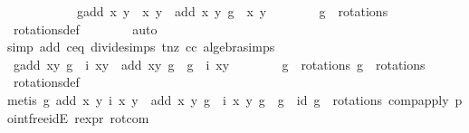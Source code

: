 \begin{isabellebody}
\ \ \isamarkupfalse%
\ {\isacharminus}\isanewline
\ \ \ \ \isamarkupfalse%
\ {}{\isacharcolon}\ {\isachardoublequoteopen}g{\isacharprime}{\isacharparenleft}add\ {\isacharparenleft}x{\isacharcomma}\ y{\isacharparenright}\ {\isacharparenleft}{\isasymtau}\ {\isacharparenleft}x{\isacharprime}{\isacharcomma}\ y{\isacharprime}{\isacharparenright}{\isacharparenright}{\isacharparenright}\ {\isacharequal}\ add\ {\isacharparenleft}x{\isacharcomma}\ y{\isacharparenright}\ {\isacharparenleft}g{\isacharprime}\ {\isacharparenleft}{\isasymtau}\ {\isacharparenleft}x{\isacharprime}{\isacharcomma}\ y{\isacharprime}{\isacharparenright}{\isacharparenright}{\isacharparenright}{\isachardoublequoteclose}\isanewline
\ \ \ \ \ \ \isamarkupfalse%
\ {\isacartoucheopen}g{\isacharprime}\ {\isasymin}\ rotations{\isacartoucheclose}\ \isamarkupfalse%
\ rotations{\isacharunderscore}def\ \isanewline
\ \ \ \ \ \ \isamarkupfalse%
{\isacharparenleft}auto{\isacharparenright}\isanewline
\ \ \ \ \ \ \isamarkupfalse%
{\isacharparenleft}simp\ add{\isacharcolon}\ c{\isacharunderscore}eq{\isacharunderscore}{}\ divide{\isacharunderscore}simps\ t{\isacharunderscore}nz\ cc\ algebra{\isacharunderscore}simps{\isacharparenright}{\isacharplus}\isanewline
\ \ \ \ \isamarkupfalse%
\ {\isachardoublequoteopen}g{\isacharprime}{\isacharparenleft}add\ {\isacharparenleft}x{\isacharcomma}y{\isacharparenright}\ {\isacharparenleft}{\isacharparenleft}g\ {\isasymcirc}\ i{\isacharparenright}\ {\isacharparenleft}x{\isacharcomma}y{\isacharparenright}{\isacharparenright}{\isacharparenright}\ {\isacharequal}\ add\ {\isacharparenleft}x{\isacharcomma}y{\isacharparenright}\ {\isacharparenleft}{\isacharparenleft}g{\isacharprime}\ {\isasymcirc}\ {\isacharparenleft}g\ {\isasymcirc}\ i{\isacharparenright}{\isacharparenright}\ {\isacharparenleft}x{\isacharcomma}y{\isacharparenright}{\isacharparenright}{\isachardoublequoteclose}\isanewline
\ \ \ \ \ \ \isamarkupfalse%
\ {\isacartoucheopen}g\ {\isasymin}\ rotations{\isacartoucheclose}\ {\isacartoucheopen}g{\isacharprime}\ {\isasymin}\ rotations{\isacartoucheclose}\ \isamarkupfalse%
\ rotations{\isacharunderscore}def\isanewline
\ \ \ \ \ \ \isamarkupfalse%
{\isacharparenleft}metis\ {\isacartoucheopen}g\ {\isacharparenleft}add\ {\isacharparenleft}x{\isacharcomma}\ y{\isacharparenright}\ {\isacharparenleft}i\ {\isacharparenleft}x{\isacharcomma}\ y{\isacharparenright}{\isacharparenright}{\isacharparenright}\ {\isacharequal}\ add\ {\isacharparenleft}x{\isacharcomma}\ y{\isacharparenright}\ {\isacharparenleft}{\isacharparenleft}g\ {\isasymcirc}\ i{\isacharparenright}\ {\isacharparenleft}x{\isacharcomma}\ y{\isacharparenright}{\isacharparenright}{\isacartoucheclose}\ {\isacartoucheopen}g\ {\isasymcirc}\ g{\isacharprime}\ {\isacharequal}\ id{\isacartoucheclose}\ {\isacartoucheopen}g{\isacharprime}\ {\isasymin}\ rotations{\isacartoucheclose}\ comp{\isacharunderscore}apply\ pointfree{\isacharunderscore}idE\ r{\isacharunderscore}expr{\isacharparenleft}{}{\isacharparenright}\ rot{\isacharunderscore}com{\isacharparenright}\isanewline

\end{isabellebody}
